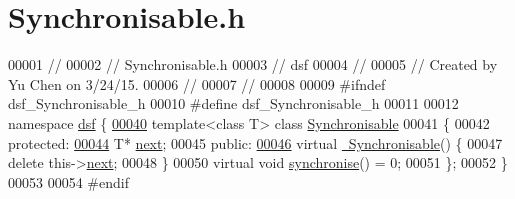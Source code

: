 \hypertarget{_synchronisable_8h_source}{}\section{Synchronisable.\+h}
\label{_synchronisable_8h_source}

\begin{DoxyCode}
00001 \textcolor{comment}{//}
00002 \textcolor{comment}{//  Synchronisable.h}
00003 \textcolor{comment}{//  dsf}
00004 \textcolor{comment}{//}
00005 \textcolor{comment}{//  Created by Yu Chen on 3/24/15.}
00006 \textcolor{comment}{//}
00007 \textcolor{comment}{//}
00008 
00009 \textcolor{preprocessor}{#ifndef dsf\_Synchronisable\_h}
00010 \textcolor{preprocessor}{#define dsf\_Synchronisable\_h}
00011 
00012 \textcolor{keyword}{namespace }\hyperlink{namespacedsf}{dsf} \{
\hypertarget{_synchronisable_8h_source_l00040}{}\hyperlink{classdsf_1_1_synchronisable}{00040}     \textcolor{keyword}{template}<\textcolor{keyword}{class} T> \textcolor{keyword}{class }\hyperlink{classdsf_1_1_synchronisable}{Synchronisable}
00041     \{
00042     \textcolor{keyword}{protected}:
\hypertarget{_synchronisable_8h_source_l00044}{}\hyperlink{classdsf_1_1_synchronisable_ae2434faac15d3184da1543a91e175713}{00044}         T* \hyperlink{classdsf_1_1_synchronisable_ae2434faac15d3184da1543a91e175713}{next};
00045     \textcolor{keyword}{public}:
\hypertarget{_synchronisable_8h_source_l00046}{}\hyperlink{classdsf_1_1_synchronisable_ae733344b5ac5742826aa4781abdc6e2c}{00046}         \textcolor{keyword}{virtual} \hyperlink{classdsf_1_1_synchronisable_ae733344b5ac5742826aa4781abdc6e2c}{~Synchronisable}() \{
00047             \textcolor{keyword}{delete} this->\hyperlink{classdsf_1_1_synchronisable_ae2434faac15d3184da1543a91e175713}{next};
00048         \}
00050         \textcolor{keyword}{virtual} \textcolor{keywordtype}{void} \hyperlink{classdsf_1_1_synchronisable_a225f9a5f6cb47d73e1ea4d788bbfcaaa}{synchronise}() = 0;
00051     \};
00052 \}
00053 
00054 \textcolor{preprocessor}{#endif}
\end{DoxyCode}
